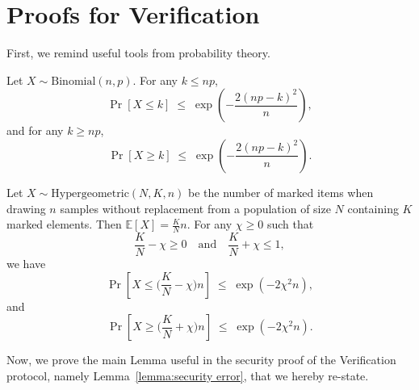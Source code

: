 \section{Proofs for Verification}
\label{section: verification proofs}

First, we remind useful tools from probability theory.
\begin{lemma}
    \label{lemma:hoeffding:binomial}
    Let $X\sim \mathrm{Binomial}(n,p)$.
    For any $k\le np$,
    \[
    \Pr[X\le k]
    \;\le\;
    \exp\!\left(-\frac{2(np-k)^2}{n}\right),
    \]
    and for any $k\ge np$,
    \[
    \Pr[X\ge k]
    \;\le\;
    \exp\!\left(-\frac{2(np-k)^2}{n}\right).
    \]
    \end{lemma}

    \begin{lemma}
        \label{lemma:hoeffding:hypergeometric}
        Let $X \sim \mathrm{Hypergeometric}(N,K,n)$ be the number of marked items when drawing $n$ samples without replacement from a population of size $N$ containing $K$ marked elements.
        Then $\mathbb{E}[X]=\frac{K}{N}n$.
        For any $\chi\ge 0$ such that
        \[
        \frac{K}{N}-\chi \ge 0
        \quad\text{and}\quad
        \frac{K}{N}+\chi \le 1,
        \]
        we have
        \[
        \Pr\!\left[
        X \le \Big(\frac{K}{N}-\chi\Big)n
        \right]
        \;\le\;
        \exp(-2\chi^2 n),
        \]
        and
        \[
        \Pr\!\left[
        X \ge \Big(\frac{K}{N}+\chi\Big)n
        \right]
        \;\le\;
        \exp(-2\chi^2 n).
        \]
        \end{lemma}

Now, we prove the main Lemma useful in the security proof of the Verification protocol, namely Lemma~\ref{lemma:security error}, that we hereby re-state.
\securityerror*

